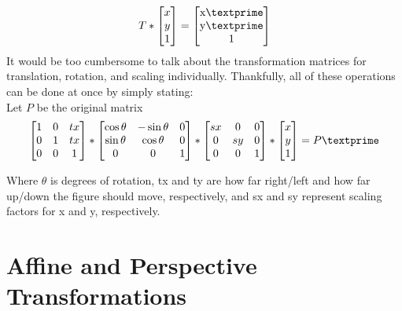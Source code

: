 \documentclass{article}
\begin{document}
\[
T
*
\begin{bmatrix}
    x\\
    y\\
    1
\end{bmatrix}
=
\begin{bmatrix}
    $x\textprime$\\
    $y\textprime$\\
    1
\end{bmatrix}
\]
It would be too cumbersome to talk about the transformation matrices for translation, rotation, and scaling individually. Thankfully, all of these operations can be done at once by simply stating: \\
Let \begin{math}P\end{math} be the original matrix \\
\[
\begin{bmatrix}
    1 & 0 & tx \\
    0 & 1 & tx \\
    0 & 0 & 1\\
\end{bmatrix}
*
\begin{bmatrix}
    \cos{\theta} & -\sin{\theta} & 0\\
    \sin{\theta} & \cos{\theta} & 0\\
    0 & 0 & 1\\
\end{bmatrix}
*
\begin{bmatrix}
    sx & 0 & 0 \\
    0 & sy & 0 \\
    0 & 0 & 1\\
\end{bmatrix}
*
\begin{bmatrix}
    x\\
    y\\
    1
\end{bmatrix}
=
P\textprime
\]

Where \begin{math}\theta\end{math} is degrees of rotation, 
tx and ty are how far right/left and how far up/down the figure should move, respectively, and sx and sy represent scaling factors for x and y, respectively. 
\section{Affine and Perspective Transformations}
\end{document}
